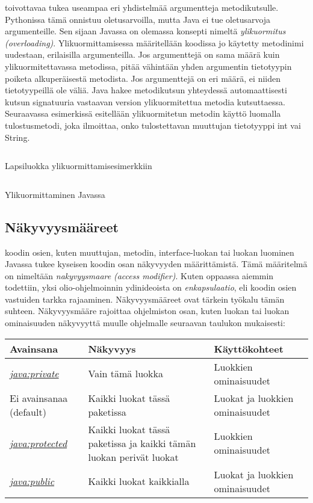 \documentclass{tufte-book}
\newcommand{\eng}[1]{\textit{(#1)}}
\newcommand{\new}[1]{\textit{\gls{#1}}}
\newcommand{\neweng}[2]{\new{#1} \eng{#2}}
\newcommand{\java}[1]{\underline{\gls{java:#1}}}
\newcommand{\newjava}[1]{\textit{\java{#1}}}
\newcommand{\code}[3]{
\begin{listing}
    \inputminted{java}{OhjelmointiopasEsimerkit/src/#1/#2.java}
    \caption{#3}
    \label{Java-#1-#2}
\end{listing}
}
\begin{document}
 toivottavaa tukea useampaa eri yhdistelmää argumentteja metodikutsulle.
Pythonissa tämä onnistuu oletusarvoilla, mutta Java ei tue oletusarvoja argumenteille. Sen
sijaan Javassa on olemassa konsepti nimeltä \neweng{ylikuormitus}{overloading}.
Ylikuormittamisessa määritellään koodissa jo käytetty metodinimi uudestaan, erilaisilla
argumenteilla. Jos argumenttejä on sama määrä kuin ylikuormitettavassa metodissa, pitää vähintään
yhden argumentin tietotyypin poiketa alkuperäisestä metodista. Jos argumenttejä on eri määrä, ei
niiden tietotyypeillä ole väliä. Java hakee metodikutsun yhteydessä automaattisesti kutsun
signatuuria vastaavan version ylikuormitettua metodia kutsuttaessa. Seuraavassa esimerkissä
esitellään ylikuormitetun metodin käyttö luomalla tulostusmetodi, joka ilmoittaa, onko
tulostettavan muuttujan tietotyyppi int vai String.

\code{week2}{BasicOverloadingChild}{Lapsiluokka ylikuormittamisesimerkkiin}
\code{week2}{BasicOverloading}{Ylikuormittaminen Javassa}

\subsection{Näkyvyysmääreet}
\label{näkyvyysmääreet}

 koodin osien, kuten muuttujan, metodin, interface-luokan tai luokan
luominen Javassa tukee kyseisen koodin osan näkyvyyden määrittämistä. Tämä määritelmä on nimeltään 
\neweng{nakyvyysmaare}{access modifier}. Kuten oppaassa aiemmin todettiin, yksi olio-ohjelmoinnin
ydinideoista on \new{enkapsulaatio}, eli koodin osien vastuiden tarkka rajaaminen. Näkyvyysmääreet
ovat tärkein työkalu tämän suhteen. Näkyvyysmääre rajoittaa ohjelmiston osan, kuten luokan tai
luokan ominaisuuden näkyvyyttä muulle ohjelmalle seuraavan taulukon mukaisesti:

\bigskip
\begin{center}
\footnotesize
\begin{tabular}{lll}
\toprule
Avainsana & Näkyvyys & Käyttökohteet \\
\midrule
\newjava{private} & Vain tämä luokka & Luokkien ominaisuudet \\
\addlinespace
Ei avainsanaa (default) & Kaikki luokat tässä paketissa & Luokat ja luokkien ominaisuudet \\
\addlinespace
\newjava{protected} & Kaikki luokat tässä paketissa ja kaikki tämän luokan perivät luokat &
Luokkien ominaisuudet \\
\addlinespace
\newjava{public} & Kaikki luokat kaikkialla & Luokat ja luokkien ominaisuudet \\
\bottomrule
\end{tabular}
\end{center}
\end{document}
